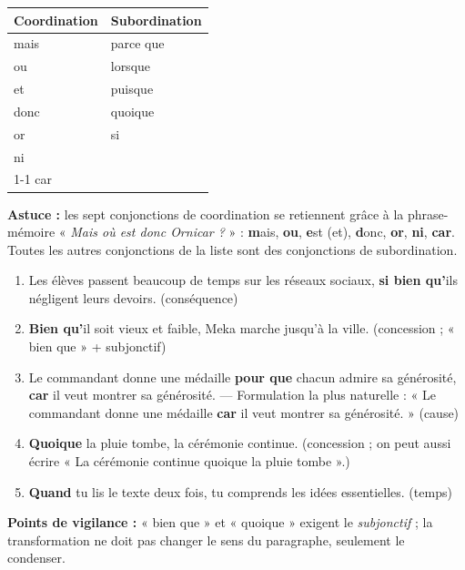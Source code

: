 \documentclass[11pt]{article}
\begin{document}
\begin{corrige}
\begin{center}
\begin{tabularx}{\linewidth}{|X|X|}
\hline
\rowcolor{popblueL} \textbf{Coordination} & \textbf{Subordination} \\
\hline
mais & parce que \\
\hline
ou & lorsque \\
\hline
et & puisque \\
\hline
donc & quoique \\
\hline
or & si \\
\hline
ni & \\
\cline{1-1}
car & \\
\hline
\end{tabularx}
\end{center}
\textbf{Astuce :} les sept conjonctions de coordination se retiennent grâce à la phrase-mémoire « \emph{Mais où est donc Ornicar ?} » : \textbf{m}ais, \textbf{ou}, \textbf{e}st (et), \textbf{d}onc, \textbf{or}, \textbf{ni}, \textbf{car}. Toutes les autres conjonctions de la liste sont des conjonctions de subordination.
\end{corrige}

\begin{corrige}
\begin{enumerate}
\item Les élèves passent beaucoup de temps sur les réseaux sociaux, \textbf{si bien qu'}ils négligent leurs devoirs. (conséquence)
\item \textbf{Bien qu'}il soit vieux et faible, Meka marche jusqu'à la ville. (concession ; « bien que » + subjonctif)
\item Le commandant donne une médaille \textbf{pour que} chacun admire sa générosité, \textbf{car} il veut montrer sa générosité. — Formulation la plus naturelle : « Le commandant donne une médaille \textbf{car} il veut montrer sa générosité. » (cause)
\item \textbf{Quoique} la pluie tombe, la cérémonie continue. (concession ; on peut aussi écrire « La cérémonie continue quoique la pluie tombe ».)
\item \textbf{Quand} tu lis le texte deux fois, tu comprends les idées essentielles. (temps)
\end{enumerate}
\textbf{Points de vigilance :} « bien que » et « quoique » exigent le \emph{subjonctif} ; la transformation ne doit pas changer le sens du paragraphe, seulement le condenser.
\end{corrige}
\end{document}
